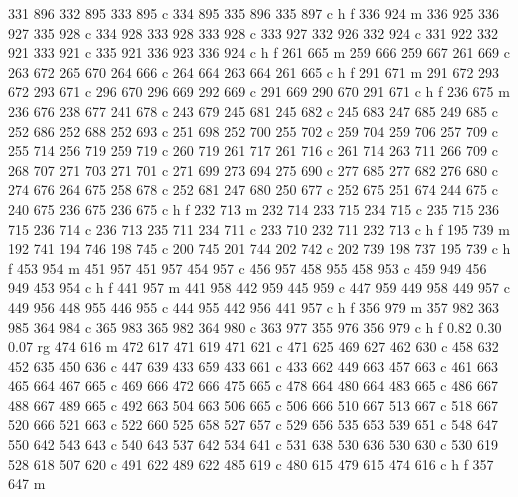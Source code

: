 {{        331 896 332 895 333 895 c
        334 895 335 896 335 897 c
        h f
        336 924 m
        336 925 336 927 335 928 c
        334 928 333 928 333 928 c
        333 927 332 926 332 924 c
        331 922 332 921 333 921 c
        335 921 336 923 336 924 c
        h f
        261 665 m
        259 666 259 667 261 669 c
        263 672 265 670 264 666 c
        264 664 263 664 261 665 c
        h f
        291 671 m
        291 672 293 672 293 671 c
        296 670 296 669 292 669 c
        291 669 290 670 291 671 c
        h f
        236 675 m
        236 676 238 677 241 678 c
        243 679 245 681 245 682 c
        245 683 247 685 249 685 c
        252 686 252 688 252 693 c
        251 698 252 700 255 702 c
        259 704 259 706 257 709 c
        255 714 256 719 259 719 c
        260 719 261 717 261 716 c
        261 714 263 711 266 709 c
        268 707 271 703 271 701 c
        271 699 273 694 275 690 c
        277 685 277 682 276 680 c
        274 676 264 675 258 678 c
        252 681 247 680 250 677 c
        252 675 251 674 244 675 c
        240 675 236 675 236 675 c
        h f
        232 713 m
        232 714 233 715 234 715 c
        235 715 236 715 236 714 c
        236 713 235 711 234 711 c
        233 710 232 711 232 713 c
        h f
        195 739 m
        192 741 194 746 198 745 c
        200 745 201 744 202 742 c
        202 739 198 737 195 739 c
        h f
        453 954 m
        451 957 451 957 454 957 c
        456 957 458 955 458 953 c
        459 949 456 949 453 954 c
        h f
        441 957 m
        441 958 442 959 445 959 c
        447 959 449 958 449 957 c
        449 956 448 955 446 955 c
        444 955 442 956 441 957 c
        h f
        356 979 m
        357 982 363 985 364 984 c
        365 983 365 982 364 980 c
        363 977 355 976 356 979 c
        h f
        0.82 0.30 0.07 rg
        474 616 m
        472 617 471 619 471 621 c
        471 625 469 627 462 630 c
        458 632 452 635 450 636 c
        447 639 433 659 433 661 c
        433 662 449 663 457 663 c
        461 663 465 664 467 665 c
        469 666 472 666 475 665 c
        478 664 480 664 483 665 c
        486 667 488 667 489 665 c
        492 663 504 663 506 665 c
        506 666 510 667 513 667 c
        518 667 520 666 521 663 c
        522 660 525 658 527 657 c
        529 656 535 653 539 651 c
        548 647 550 642 543 643 c
        540 643 537 642 534 641 c
        531 638 530 636 530 630 c
        530 619 528 618 507 620 c
        491 622 489 622 485 619 c
        480 615 479 615 474 616 c
        h f
        357 647 m
}}
